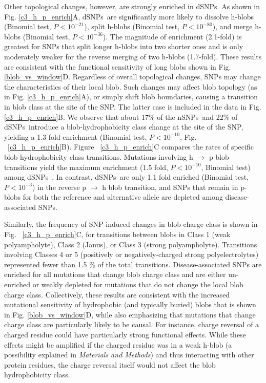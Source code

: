 \documentclass[9pt,twocolumn,twoside,lineno]{pnas-new}
\newcommand{\dSNPs}{dSNPs~}
\newcommand{\nSNPs}{nSNPs~}
\newcommand{\hydrochar}{hydrophobicity class}
\newcommand{\chargechar}{charge class}
\begin{document}
Other topological changes, however, are strongly enriched in dSNPs. As shown in Fig. \ref{c3_h_p_enrich}A, \dSNPs are significantly more likely to dissolve h-blobs (Binomial test, $P<10^{-21}$), split h-blobs (Binomial test, $P<10^{-80}$), and merge h-blobs (Binomial test, $P<10^{-36}$). The magnitude of enrichment (2.1-fold) is greatest for SNPs that split longer h-blobs into two shorter ones and is only moderately weaker for the reverse merging of two h-blobs (1.7-fold). These results are consistent with the functional sensitivity of long blobs shown in Fig. \ref{blob_vs_window}D. Regardless of overall topological changes, SNPs may change the characteristics of their local blob. Such changes may affect blob topology (as in Fig. \ref{c3_h_p_enrich}A), or simply shift blob boundaries, causing a transition in blob class at the site of the SNP. The latter case is included in the data in Fig. \ref{c3_h_p_enrich}B. We observe that about 17\% of the \nSNPs and 22\% of \dSNPs introduce a blob-\hydrochar{} change at the site of the SNP, yielding a 1.3 fold enrichment (Binomial test, $P<10^{-10}$, Fig. ~\ref{c3_h_p_enrich}B). Figure ~\ref{c3_h_p_enrich}C compares the rates of specific blob \hydrochar{} transitions. Mutations involving h $\rightarrow$ p blob transitions yield the maximum enrichment (1.5 fold, $P<10^{-10}$, Binomial test) among \dSNPs{}. In contrast, \dSNPs are only 1.1 fold enriched (Binomial test, $P<10^{-3}$) in the reverse p $\rightarrow$ h blob transition, and SNPs that remain in p-blobs for both the reference and alternative allele are depleted among disease-associated SNPs. 

Similarly, the frequency of SNP-induced changes in blob \chargechar{} is shown in Fig. ~\ref{c3_h_p_enrich}C, for transitions between blobs in Class 1 (weak polyampholyte), Class 2 (Janus), or Class 3 (strong polyampholyte). Transitions involving Classes 4 or 5 (positively or negatively-charged strong polyelectrolytes) represented fewer than 1.5 \% of the total transitions. Disease-associated SNPs are enriched for all mutations that change blob \chargechar{} and are either un-enriched or weakly depleted for mutations that do not change the local blob \chargechar. Collectively, these results are consistent with the increased mutational sensitivity of hydrophobic (and typically buried) blobs that is shown in Fig. \ref{blob_vs_window}D, while also emphasizing that mutations that change \chargechar{} are particularly likely to be causal. For instance, charge reversal of a charged residue could have particularly strong functional effects. While these effects might be amplified if the charged residue was in a weak h-blob (a possibility explained in {\em Materials and Methods}) and thus interacting with other protein residues, the charge reversal itself would not affect the blob \hydrochar{}.  
\end{document}
